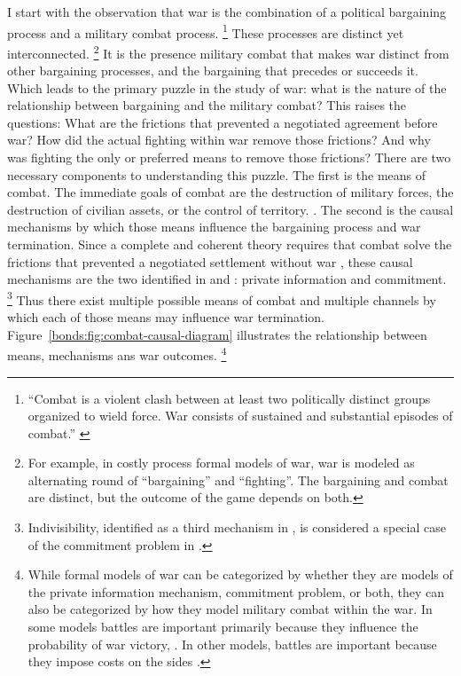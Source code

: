 I start with the observation that war is the combination of a political bargaining process and a military combat process. %
\footnote{%
  ``Combat is a violent clash between at least two politically
  distinct groups organized to wield force. War consists of sustained
  and substantial episodes of combat.'' \parencite{Reiter2003} %
} %
These processes are distinct yet interconnected.%
\footnote{%
  For example, in costly process formal models of war, war is modeled
  as alternating round of ``bargaining'' and ``fighting''. %
  The bargaining and combat are distinct, but the outcome of the game
  depends on both. %
} %
It is the presence military combat that makes war distinct from other bargaining processes, and the bargaining that precedes or succeeds it. %
Which leads to the primary puzzle in the study of war: what is the nature of the relationship between bargaining and the military combat?
This raises the questions:
What are the frictions that prevented a negotiated agreement before war?
How did the actual fighting within war remove those frictions?
And why was fighting the only or preferred means to remove those frictions?
There are two necessary components to understanding this puzzle. %
The first is the means of combat. %
The immediate goals of combat are the destruction of military forces, the destruction of civilian assets, or the control of territory.
\parencite[30]{Reiter2003}. %
The second is the causal mechanisms by which those means influence the bargaining process and war termination. %
Since a complete and coherent theory requires that combat solve the frictions that prevented a negotiated settlement without war \parencite{LeventogluSlantchev2007}, these causal mechanisms are the two identified in \textcite{Fearon1995} and \textcite{Powell2006}: private information and commitment.%
\footnote{Indivisibility, identified as a third mechanism in \textcite{Fearon1995}, is considered a special case of the commitment problem in \textcite{Powell2006}.}
Thus there exist multiple possible means of combat and multiple channels by which each of those means may influence war termination.
Figure~\ref{bonds:fig:combat-causal-diagram} illustrates the relationship between means, mechanisms ans war outcomes.%
\footnote{
While formal models of war can be categorized by whether they are models of the private information mechanism, commitment problem, or both, they can also be categorized by how they model military combat within the war.
In some models battles are important primarily because they influence the probability of war victory, \parencites{Powell2004}{Wagner2000}{LeventogluSlantchev2007}{Slantchev2003}{SmithStam2004}.
In other models, battles are important because they impose costs on the sides \parencites{FilsonWerner2002}{Powell2004}{LeventogluSlantchev2007}. %
}

